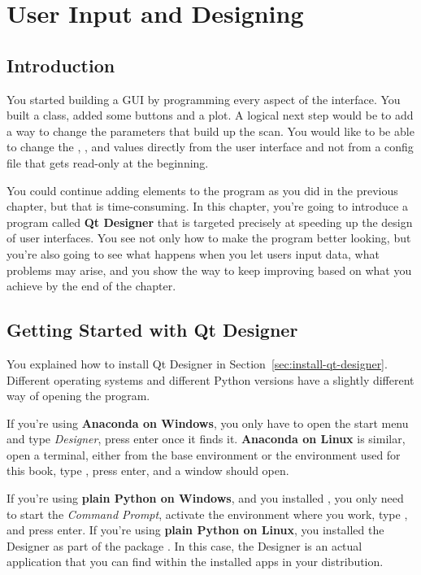 \chapter{User Input and Designing}\label{ch:user-input-designer}

\section{Introduction}\label{sec:user-input-introduction}
You started building a GUI by programming every aspect of the interface. You built a  class, added some buttons and a plot. A logical next step would be to add a way to change the parameters that build up the scan. You would like to be able to change the , , and  values directly from the user interface and not from a config file that gets read-only at the beginning.

You could continue adding elements to the program as you did in the previous chapter, but that is time-consuming. In this chapter, you're going to introduce a program called \textbf{Qt Designer} that is targeted precisely at speeding up the design of user interfaces. You see not only how to make the program better looking, but you're also going to see what happens when you let users input data, what problems may arise, and you show the way to keep improving based on what you achieve by the end of the chapter.

\section{Getting Started with Qt Designer}\label{sec:getting-started-with-qt-designer}
You explained how to install Qt Designer in Section~\ref{sec:install-qt-designer}. Different operating systems and different Python versions have a slightly different way of opening the program.

If you're using \textbf{Anaconda on Windows}, you only have to open the start menu and type \textit{Designer}, press \py{}enter once it finds it. \textbf{Anaconda on Linux} is similar, open a terminal, either from the base environment or the environment used for this book, type , press enter, and a window should open.

If you're using \textbf{plain Python on Windows}, and you installed , you only need to start the \emph{Command Prompt}, activate the environment where you work, type , and press enter. If you're using \textbf{plain Python on Linux}, you installed the Designer as part of the package . In this case, the Designer is an actual application that you can find within the installed apps in your distribution.

